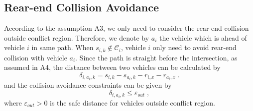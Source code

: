 \documentclass[letterpaper, 10 pt, conference]{ieeeconf}
\begin{document}
\subsection{Rear-end Collision Avoidance}
According to the assumption A3, we only need to consider the rear-end collision outside conflict region. Therefore, we denote by $a_i$ the vehicle which is ahead of vehicle $i$ in same path. When $s_{i,k}\notin\mathcal{C}_i$, vehicle $i$ only need to avoid rear-end collision with vehicle $a_i$. Since the path is straight before the intersection, as assumed in A4, the distance between two vehicles can be calculated by
\[
\delta_{i,a_i,k}=s_{i,k} - s_{a_i,k} - r_{i,x}-r_{a_i,x}\;.
\]
and the collision avoidance constraints can be given by
\begin{equation}
\label{eq::outcons}
\delta_{i,a_i,k} \leq \varepsilon_{out} \;,
\end{equation}
where $\varepsilon_{out}>0$ is the safe distance for vehicles outside conflict region.
\end{document}
